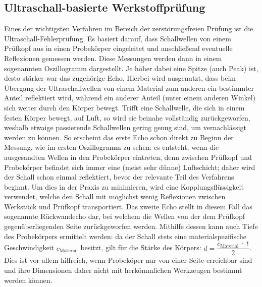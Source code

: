 \documentclass[reducespace,stylepage,semiarbeit]{spezidoc}
\begin{document}
\subsection{Ultraschall-basierte Werkstoffprüfung}
Eines der wichtigsten Verfahren im Bereich der zerstörungsfreien Prüfung ist die Ultraschall-Fehlerprüfung. Es basiert darauf, dass Schallwellen von einem Prüfkopf aus in einen Probekörper eingeleitet und anschließend eventuelle Reflexionen gemessen werden. Diese Messungen werden dann in einem sogenannten Oszillogramm dargestellt.
Je höher dabei eine Spitze (auch Peak) ist, desto stärker war das zugehörige Echo. Hierbei wird ausgenutzt, dass beim Übergang der Ultraschallwellen von einem Material zum anderen ein bestimmter Anteil reflektiert wird, während ein anderer Anteil (unter einem anderen Winkel) sich weiter durch den Körper bewegt. Trifft eine Schallwelle, die sich in einem festen Körper bewegt, auf Luft, so wird sie beinahe vollständig zurückgeworfen, weshalb etwaige passierende Schallwellen gering genug sind, um vernachlässigt werden zu können. So erscheint das erste Echo schon direkt zu Beginn der Messung, wie im ersten Oszillogramm zu sehen: es entsteht, wenn die ausgesandten Wellen in den Probekörper eintreten, denn zwischen Prüfkopf und Probekörper befindet sich immer eine (meist sehr dünne) Luftschicht; daher wird der Schall schon einmal reflektiert, bevor der relevante Teil des Verfahrens beginnt. Um dies in der Praxis zu minimieren, wird eine Kopplungsflüssigkeit verwendet, welche den Schall mit möglichst wenig Reflexionen zwischen Werkstück und Prüfkopf transportiert. Das zweite Echo stellt in diesem Fall das sogenannte Rückwandecho dar, bei welchem die Wellen von der dem Prüfkopf gegenüberliegenden Seite zurückgeworfen werden. Mithilfe dessen kann auch Tiefe des Probekörpers ermittelt werden: da der Schall stets eine materialspezifische Geschwindigkeit $c_\mathrm{Material}$ \cite{schallgeschwindigkeiten} besitzt, gilt für die Stärke des Körpers: $d = \dfrac{c_\mathrm{Material}~\cdot~t}{2}$. Dies ist vor allem hilfreich, wenn Probeköper nur von einer Seite erreichbar sind und ihre Dimensionen daher nicht mit herkömmlichen Werkzeugen bestimmt werden können.\\
\end{document}
